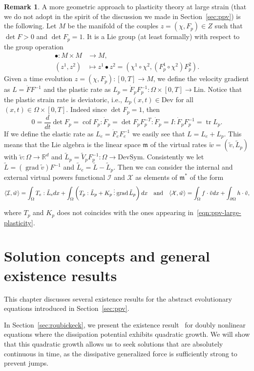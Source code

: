 \documentclass[a4paper,10pt,twoside]{amsbook}
\numberwithin{section}{chapter}
\numberwithin{equation}{chapter}
\theoremstyle{definition}
\newtheorem{rmk}[prop]{Remark}
\DeclareMathOperator{\cof}{cof}
\DeclareMathOperator{\tr}{tr}
\DeclareMathOperator{\grad}{grad}
\DeclarePairedDelimiter{\dual}{\langle}{\rangle}
\newcommand{\threedots}{\mathbin{\vdots}}
\begin{document}
\begin{rmk}
\label{rmk:plasticity-lie-group}
A more geometric approach to plasticity theory at large strain (that we do not adopt in the spirit of the discussion we made in Section~\ref{sec:ppv}) is the following. Let $M$ be the manifold of the couples $z=(\chi,F_p)\in Z$ such that $\det F>0$ and $\det F_p=1$. It is a Lie group (at least formally) with respect to the group operation
\[
\begin{split}
\bullet\colon M\times M&\to M, \\
(z^1,z^2)&\mapsto z^1\bullet z^2=(\chi^1\circ\chi^2,(F_p^1\circ \chi^2)F_p^2).
\end{split}
\]
Given a time evolution $z=(\chi,F_p)\colon[0,T]\to M$, we define the velocity gradient as $L=\dot FF^{-1}$ and the plastic rate as $L_p=\dot F_pF_p^{-1}\colon\Omega\times[0,T]\to\text{Lin}$. Notice that the plastic strain rate is deviatoric, i.e., $L_p(x,t)\in\text{Dev}$ for all $(x,t)\in\Omega\times[0,T]$. Indeed since $\det F_p=1$, then
\[
0=\frac{d}{dt}\det F_p=\cof F_p:\dot F_p=\det F_p F_p^{-T}:\dot F_p=I:\dot F_pF_p^{-1}=\tr L_p.
\]
If we define the elastic rate as $L_e=\dot F_eF_e^{-1}$ we easily see that $L=L_e+L_p$. This means that the Lie algebra is the linear space $\mathfrak{m}$ of the virtual rates $\tilde w=(\tilde v,\tilde L_p)$ with $\tilde v\colon\Omega\to\mathbb{R}^d$ and $\tilde L_p=\tilde V_pF_p^{-1}\colon\Omega\to\text{DevSym}$. Consistently we let $\tilde L=(\grad\tilde v)F^{-1}$ and $\tilde L_e=\tilde L-\tilde L_p$. Then we can consider the internal and external virtual powers functional $\mathcal{I}$ and $\mathcal{X}$ as elements of $\mathfrak{m}^*$ of the form
\[
\dual{\mathcal{I},\tilde w}=\int_\Omega T_e:\tilde L_edx+\int_\Omega\left(T_p:\tilde L_p+K_p\threedots\grad\tilde L_p\right)dx
\quad\text{and}\quad
\dual{\mathcal{X},\tilde w}=\int_\Omega f\cdot\tilde vdx+\int_{\partial\Omega}h\cdot\tilde v,
\]
\end{rmk}
where $T_p$ and $K_p$ does not coincides with the ones appearing in~\eqref{eqn:ppv-large-plasticity}.

\chapter{Solution concepts and general existence results}
\label{chap:solution-concepts}

This chapter discusses several existence results for the abstract evolutionary equations introduced in Section~\ref{sec:ppv}.

In Section~\ref{sec:roubickeck}, we present the existence result~\cite[Proposition 11.1]{roubicek-pde} for doubly nonlinear equations where the dissipation potential exhibits quadratic growth. We will show that this quadratic growth allows us to seek solutions that are absolutely continuous in time, as the dissipative generalized force is sufficiently strong to prevent jumps.
\end{document}
